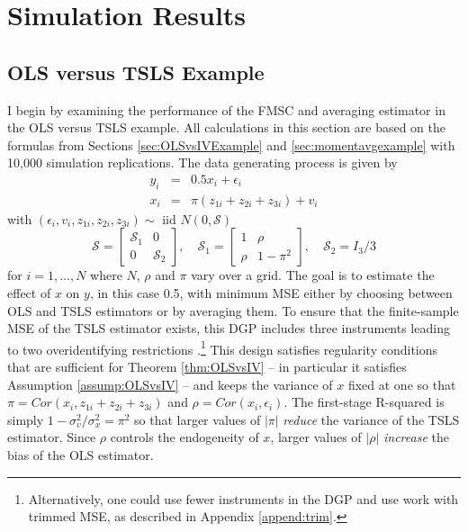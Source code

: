 \section{Simulation Results}
\label{sec:simulations}
\subsection{OLS versus TSLS Example}
\label{sec:OLSvsIVsim}
I begin by examining the performance of the FMSC and averaging estimator in the OLS versus TSLS example.
All calculations in this section are based on the formulas from Sections \ref{sec:OLSvsIVExample} and \ref{sec:momentavgexample} with 10,000 simulation replications. 
The data generating process is given by 
\begin{eqnarray}
	y_i &=& 0.5 x_i + \epsilon_i\\
	\label{eq:OLSvsIVDGP1}
	x_i &=& \pi(z_{1i} + z_{2i} + z_{3i}) + v_i
	\label{eq:OLSvsIVDGP2}
\end{eqnarray}
with $(\epsilon_i, v_i, z_{1i}, z_{2i}, z_{3i}) \sim \mbox{ iid } N(0, \mathcal{S})$
\begin{equation}
	\mathcal{S} = \left[ \begin{array}
		{cc} \mathcal{S}_1 & 0 \\ 0 & \mathcal{S}_2
	\end{array} \right], \quad 
	\mathcal{S}_1 = \left[ \begin{array}
		{cc} 1 & \rho \\ \rho & 1 - \pi^2 
	\end{array} \right], \quad \mathcal{S}_2 = I_3 / 3
	\label{eq:OLSvsIVDGP3}
\end{equation}
for $i= 1, \hdots, N$ where $N$, $\rho$ and $\pi$ vary over a grid.
The goal is to estimate the effect of $x$ on $y$, in this case 0.5, with minimum MSE either by choosing between OLS and TSLS estimators or by averaging them.
To ensure that the finite-sample MSE of the TSLS estimator exists, this DGP includes three instruments leading to two overidentifying restrictions \citep{Phillips1980}.\footnote{Alternatively, one could use fewer instruments in the DGP and use work with trimmed MSE, as described in Appendix \ref{append:trim}.}
This design satisfies regularity conditions that are sufficient for Theorem \ref{thm:OLSvsIV} -- in particular it satisfies Assumption \ref{assump:OLSvsIV} -- and keeps the variance of $x$ fixed at one so that $\pi = Cor(x_i, z_{1i} + z_{2i} + z_{3i})$ and $\rho = Cor(x_i,\epsilon_i)$.
The first-stage R-squared is simply $1 - \sigma_v^2/\sigma_x^2 = \pi^2$ so that larger values of $|\pi|$ \emph{reduce} the variance of the TSLS estimator.
Since $\rho$ controls the endogeneity of $x$, larger values of $|\rho|$ \emph{increase} the bias of the OLS estimator.

